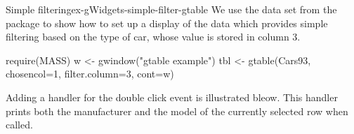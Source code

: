 \begin{example}{Simple filtering}{ex-gWidgets-simple-filter-gtable}
  We use the  data set from the  package to
  show how to set up a display of the data which provides simple
  filtering based on the type of car, whose value is stored in column 3.
  
\begin{Schunk}
\begin{Sinput}
 require(MASS)
 w <- gwindow("gtable example")
 tbl <- gtable(Cars93, chosencol=1, filter.column=3, cont=w)
\end{Sinput}
\end{Schunk}

Adding a handler for the double click event is illustrated bleow. This
handler prints both the manufacturer and the model of the currently
selected row when called.
\begin{Schunk}
\end{Schunk}
\end{example}


